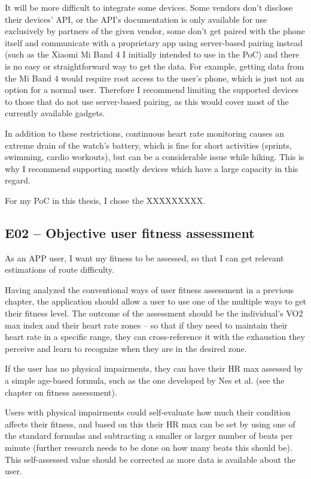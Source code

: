 It will be more difficult to integrate some devices.
Some vendors don't disclose their devices' API, or the API's documentation is only available for use exclusively by partners of the given vendor,
some don't get paired with the phone itself and communicate with a proprietary app using server-based pairing instead (such as the Xiaomi Mi Band 4 I initially intended to use in the PoC) and there is no easy or straightforward way to get the data.
For example, getting data from the Mi Band 4 would require root access to the user's phone\cite{miband4-server-based}, which is just not an option for a normal user.
Therefore I recommend limiting the supported devices to those that do not use server-based pairing, as this would cover most of the currently available gadgets.

In addition to these restrictions, continuous heart rate monitoring causes an extreme drain of the watch's battery, which is fine for short activities (sprints, swimming, cardio workouts), but can be a considerable issue while hiking.
This is why I recommend supporting mostly devices which have a large capacity in this regard.

For my PoC in this thesis, I chose the XXXXXXXXX.


\subsection*{E02 -- Objective user fitness assessment}
As an APP user, I want my fitness to be assessed, so that I can get relevant estimations of route difficulty.

Having analyzed the conventional ways of user fitness assessment in a previous chapter, the application should allow a user to use one of the multiple ways to get their fitness level.
The outcome of the assessment should be the individual's VO2 max index and their heart rate zones -- so that if they need to maintain their heart rate in a specific range, they can cross-reference it with the exhaustion they perceive and learn to recognize when they are in the desired zone.

If the user has no physical impairments, they can have their HR max assessed by a simple age-based formula, such as the one developed by Nes et al. (see the chapter on fitness assessment).

Users with physical impairments could self-evaluate how much their condition affects their fitness, and based on this their HR max can be set by using one of the standard formulas and subtracting a smaller or larger number of beats per minute (further research needs to be done on how many beats this should be).
This self-assessed value should be corrected as more data is available about the user.

